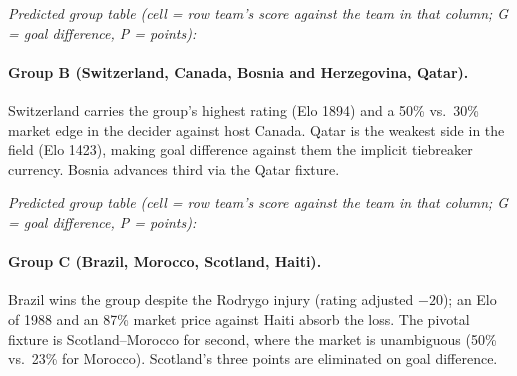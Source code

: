 \documentclass[11pt,letterpaper]{article}
\begin{document}
\noindent\textit{\footnotesize Predicted group table (cell = row team's score against the team in that column; G = goal difference, P = points):}



\paragraph{Group B (Switzerland, Canada, Bosnia and Herzegovina, Qatar).} Switzerland carries the group's highest rating (Elo 1894) and a 50\% vs.\ 30\% market edge in the decider against host Canada. Qatar is the weakest side in the field (Elo 1423), making goal difference against them the implicit tiebreaker currency. Bosnia advances third via the Qatar fixture.

\noindent\textit{\footnotesize Predicted group table (cell = row team's score against the team in that column; G = goal difference, P = points):}



\paragraph{Group C (Brazil, Morocco, Scotland, Haiti).} Brazil wins the group despite the Rodrygo injury (rating adjusted $-20$); an Elo of 1988 and an 87\% market price against Haiti absorb the loss. The pivotal fixture is Scotland--Morocco for second, where the market is unambiguous (50\% vs.\ 23\% for Morocco). Scotland's three points are eliminated on goal difference.
\end{document}
